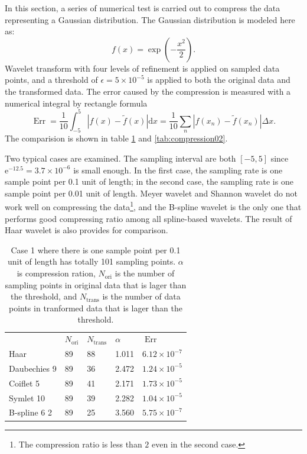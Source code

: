 \documentclass{book}
\newcommand{\mathd}{\mathrm{d}}
\newcommand{\mathe}{\mathrm{e}}
\newcommand{\tmop}[1]{\ensuremath{\operatorname{#1}}}
\begin{document}
In this section, a series of numerical test is carried out to compress the
data representing a Gaussian distribution. The Gaussian distribution is
modeled here as:
\[ f (x) = \exp \left( - \frac{x^2}{2} \right) . \]
Wavelet transform with four levels of refinement is applied on sampled data
points, and a threshold of $\epsilon = 5 \times 10^{- 5}$ is applied to both
the original data and the transformed data. The error caused by the
compression is measured with a numerical integral by rectangle formula
\[ \tmop{Err} = \frac{1}{10} \int_{- 5}^5 | f (x) - \tilde{f} (x) | \mathd x =
   \frac{1}{10} \sum_n | f (x_n) - \tilde{f} (x_n) | \Delta x. \]
The comparision is shown in table \ref{tab:compression01} and
\ref{tab:compression02}.

Two typical cases are examined. The sampling interval are both $[- 5, 5]$
since $\mathe^{- 12.5} = 3.7 \times 10^{- 6}$ is small enough. In the first
case, the sampling rate is one sample point per 0.1 unit of length; in the
second case, the sampling rate is one sample point per 0.01 unit of length.
Meyer wavelet and Shannon wavelet do not work well on compressing the
data\footnote{The compression ratio is less than $2$ even in the second
case.}, and the B-spline wavelet is the only one that performs good
compressing ratio among all spline-based wavelets. The result of Haar wavelet
is also provides for comparison.

\begin{table}[h]
  \begin{tabular}{p{2.4cm}p{2.4cm}p{2.4cm}p{2.4cm}p{2.4cm}}
    \  & $N_{\tmop{ori}}$ & $N_{\tmop{trans}}$ & $\alpha$ & $\tmop{Err}$\\
    Haar & 89 & 88 & 1.011 & $6.12 \times 10^{- 7}$\\
    Daubechies 9 & 89 & 36 & 2.472 & $1.24 \times 10^{- 5}$\\
    Coiflet 5 & 89 & 41 & 2.171 & $1.73 \times 10^{- 5}$\\
    Symlet 10 & 89 & 39 & 2.282 & $1.04 \times 10^{- 5}$\\
    B-spline 6 2 & 89 & 25 & 3.560 & $5.75 \times 10^{- 7}$
  \end{tabular}
  \caption{\label{tab:compression01}Case 1 where there is one sample point per
  0.1 unit of length has totally 101 sampling points. $\alpha$ is compression
  ration, $N_{\tmop{ori}}$ is the number of sampling points in original data
  that is lager than the threshold, and $N_{\tmop{trans}}$ is the number of
  data points in tranformed data that is lager than the threshold.}
\end{table}
\end{document}
